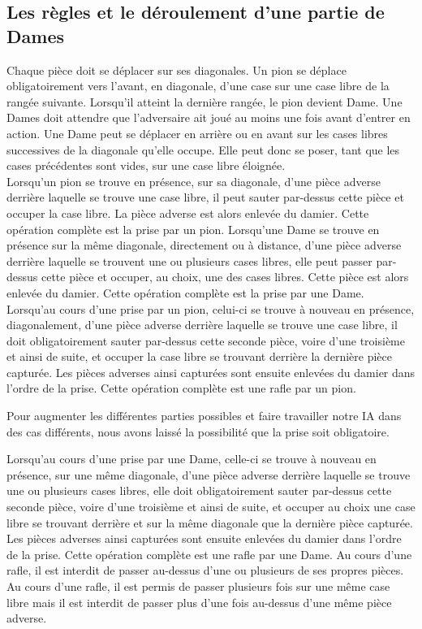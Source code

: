 \documentclass[12,french]{report}
\begin{document}
\subsection{Les règles et le déroulement d'une partie de Dames}

Chaque pièce doit se déplacer sur ses diagonales. Un pion se déplace obligatoirement vers l’avant, en diagonale, d’une case sur une case libre de la rangée suivante. Lorsqu'il atteint la dernière rangée, le pion devient Dame. Une Dames doit attendre que l’adversaire ait joué au moins une fois avant d’entrer en action. Une Dame peut se déplacer en arrière ou en avant sur les cases libres successives de la diagonale qu’elle occupe. Elle peut donc se poser, tant que les cases précédentes sont vides, sur une case libre éloignée.\\

Lorsqu’un pion se trouve en présence, sur sa diagonale, d’une pièce adverse derrière laquelle se trouve une case libre, il peut sauter par-dessus cette pièce et occuper la case libre. La pièce adverse est alors enlevée du damier. Cette opération complète est la prise par un pion. Lorsqu’une Dame se trouve en présence sur la même diagonale, directement ou à distance, d’une pièce adverse derrière laquelle se trouvent une ou plusieurs cases libres, elle peut passer par-dessus cette pièce et occuper, au choix, une des cases libres. Cette pièce est alors enlevée du damier. Cette opération complète est la prise par une Dame.\\

Lorsqu’au cours d’une prise par un pion, celui-ci se trouve à nouveau en présence, diagonalement, d’une pièce adverse derrière laquelle se trouve une case libre, il doit obligatoirement sauter par-dessus cette seconde pièce, voire d’une troisième et ainsi de suite, et occuper la case libre se trouvant derrière la dernière pièce capturée. 
Les pièces adverses ainsi capturées sont ensuite enlevées du damier dans l’ordre de la prise. Cette opération complète est une rafle par un pion.

Pour augmenter les différentes parties possibles et faire travailler notre IA dans des cas différents, nous avons laissé la possibilité que la prise soit obligatoire. 

 Lorsqu’au cours d’une prise par une Dame, celle-ci se trouve à nouveau en présence, sur une même diagonale, d’une pièce adverse derrière laquelle se trouve une ou plusieurs cases libres, elle doit obligatoirement sauter par-dessus cette seconde pièce, voire d’une troisième et ainsi de suite, et occuper au choix une case libre se trouvant derrière et sur la même diagonale que la dernière pièce capturée. Les pièces adverses ainsi capturées sont ensuite enlevées du damier dans l’ordre de la prise. Cette opération complète est une rafle par une Dame. Au cours d’une rafle, il est interdit de passer au-dessus d'une ou plusieurs de ses propres pièces. Au cours d’une rafle, il est permis de passer plusieurs fois sur une même case libre mais il est interdit de passer plus d’une fois au-dessus d’une même pièce adverse.\\
\end{document}
